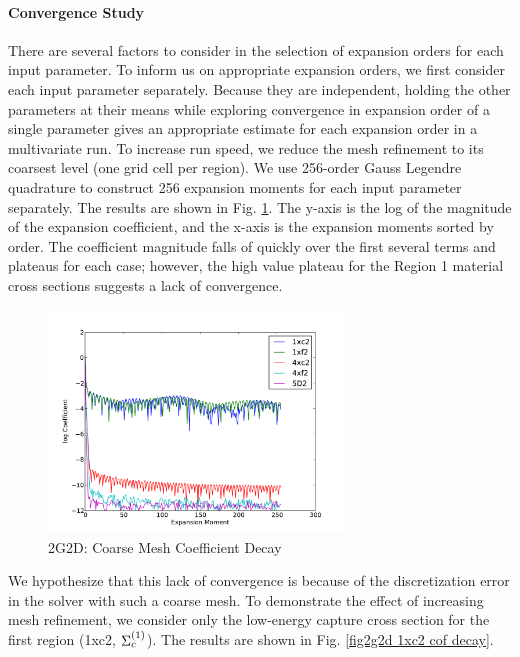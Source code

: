 \paragraph{Convergence Study}
There are several factors to consider in the selection of expansion orders for each input parameter.  To inform us on appropriate expansion orders, we first consider each input parameter separately.  Because they are independent, holding the other parameters at their means while exploring convergence in expansion order of a single parameter gives an appropriate estimate for each expansion order in a multivariate run.  To increase run speed, we reduce the mesh refinement to its coarsest level (one grid cell per region).  We use 256-order Gauss Legendre quadrature to construct 256 expansion moments for each input parameter separately.  The results are shown in Fig. \ref{fig:2g2d5v coarse cof}.  The y-axis is the log of the magnitude of the expansion coefficient, and the x-axis is the expansion moments sorted by order.  The coefficient magnitude falls of quickly over the first several terms and plateaus for each case; however, the high value plateau for the Region 1 material cross sections suggests a lack of convergence.
\begin{figure}[H]
\centering
   \includegraphics[width=0.7\textwidth]{../graphics/coefficient_decay}
   \caption{2G2D: Coarse Mesh Coefficient Decay}
   \label{fig:2g2d5v coarse cof}
\end{figure}
We hypothesize that this lack of convergence is because of the discretization error in the solver with such a coarse mesh.   To demonstrate the effect of increasing mesh refinement, we consider only the low-energy capture cross section for the first region (1xc2, $\Sigma_{c}^{(1)}$).  The results are shown in Fig. \ref{fig2g2d 1xc2 cof decay}.

